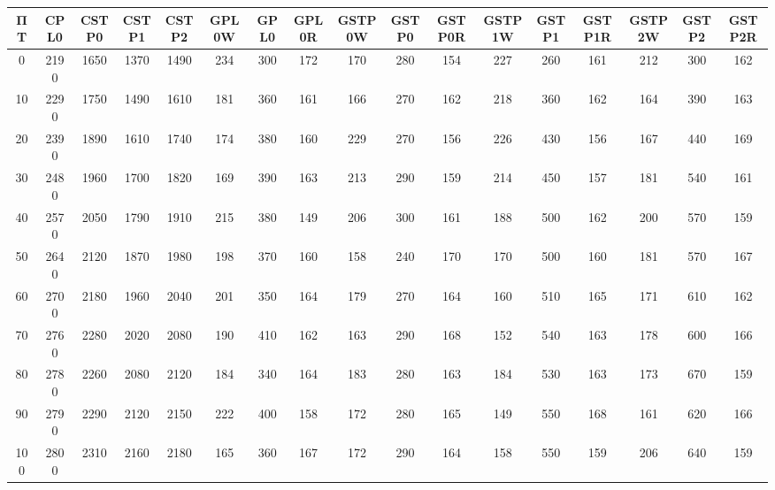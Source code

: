 \begin{tabular}{|c|c|c|c|c|c|c|c|c|c|c|c|c|c|c|c|c|}
\hline
ΠΤ&CPL0&CSTP0&CSTP1&CSTP2&GPL0W&GPL0&GPL0R&GSTP0W&GSTP0&GSTP0R&GSTP1W&GSTP1&GSTP1R&GSTP2W&GSTP2&GSTP2R\\\hline
\hline
0&2190&1650&1370&1490&234&300&172&170&280&154&227&260&161&212&300&162\\
\hline
10&2290&1750&1490&1610&181&360&161&166&270&162&218&360&162&164&390&163\\
\hline
20&2390&1890&1610&1740&174&380&160&229&270&156&226&430&156&167&440&169\\
\hline
30&2480&1960&1700&1820&169&390&163&213&290&159&214&450&157&181&540&161\\
\hline
40&2570&2050&1790&1910&215&380&149&206&300&161&188&500&162&200&570&159\\
\hline
50&2640&2120&1870&1980&198&370&160&158&240&170&170&500&160&181&570&167\\
\hline
60&2700&2180&1960&2040&201&350&164&179&270&164&160&510&165&171&610&162\\
\hline
70&2760&2280&2020&2080&190&410&162&163&290&168&152&540&163&178&600&166\\
\hline
80&2780&2260&2080&2120&184&340&164&183&280&163&184&530&163&173&670&159\\
\hline
90&2790&2290&2120&2150&222&400&158&172&280&165&149&550&168&161&620&166\\
\hline
100&2800&2310&2160&2180&165&360&167&172&290&164&158&550&159&206&640&159\\
\hline
\end{tabular}
